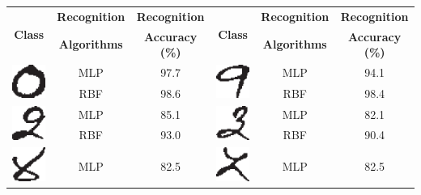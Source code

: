 \begin{table}[h]
\centering
\begin{tabular}{|c|c|c|c|c|c|}
\hline
\multirow{2}{*}{\textbf{Class}} & \textbf{Recognition} & \textbf{Recognition } & \multirow{2}{*}{\textbf{Class}} & \textbf{Recognition} & \textbf{Recognition }\tabularnewline
 & \textbf{Algorithms} & \textbf{Accuracy (\%)} &  & \textbf{Algorithms} & \textbf{Accuracy (\%)}\tabularnewline
\hline
\multirow{2}{*}{\includegraphics[scale=0.25]{figures/datasets/nhcr/numerals/zero}} & MLP & 97.7 & \multirow{2}{*}{\includegraphics[scale=0.25]{figures/datasets/nhcr/numerals/one}} & MLP & 94.1\tabularnewline
\cline{2-3} \cline{5-6}
 & RBF & 98.6 &  & RBF & 98.4\tabularnewline
\hline
\multirow{2}{*}{\includegraphics[scale=0.25]{figures/datasets/nhcr/numerals/two}} & MLP & 85.1 & \multirow{2}{*}{\includegraphics[scale=0.25]{figures/datasets/nhcr/numerals/three}} & MLP & 82.1\tabularnewline
\cline{2-3} \cline{5-6}
 & RBF & 93.0 &  & RBF & 90.4\tabularnewline
\hline
\multirow{2}{*}{\includegraphics[scale=0.25]{figures/datasets/nhcr/numerals/four}} & MLP & 82.5 & \multirow{2}{*}{\includegraphics[scale=0.25]{figures/datasets/nhcr/numerals/five}} & MLP & 82.5\tabularnewline

\end{tabular}
\end{table}
